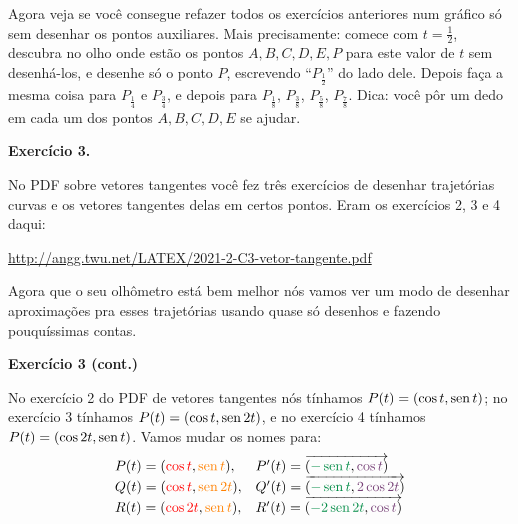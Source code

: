 \documentclass[oneside,12pt]{article}
\begin{document}
Agora veja se você consegue refazer todos os exercícios anteriores num
gráfico só sem desenhar os pontos auxiliares. Mais precisamente:
comece com $t=\frac12$, descubra no olho onde estão os pontos
$A,B,C,D,E,P$ para este valor de $t$ sem desenhá-los, e desenhe só o
ponto $P$, escrevendo ``$P_{\frac12}$'' do lado dele. Depois faça a
mesma coisa para $P_{\frac14}$ e $P_{\frac34}$, e depois para
$P_{\frac18}$, $P_{\frac38}$, $P_{\frac58}$, $P_{\frac78}$. Dica: você
pôr um dedo em cada um dos pontos $A, B, C, D, E$ se ajudar.



\newpage

%                                                 

{\bf Exercício 3.}

No PDF sobre vetores tangentes você fez três exercícios de desenhar
trajetórias curvas e os vetores tangentes delas em certos pontos. Eram
os exercícios 2, 3 e 4 daqui:

\ssk

{\footnotesize

\url{http://angg.twu.net/LATEX/2021-2-C3-vetor-tangente.pdf}

}

\msk

Agora que o seu olhômetro está bem melhor nós vamos ver um modo de
desenhar aproximações pra esses trajetórias usando quase só desenhos e
fazendo pouquíssimas contas.


\newpage


{\bf Exercício 3 (cont.)}

\ssk

\def\CA{\ColorRed}
\def\CB{\ColorOrange}
\def\CC{\ColorGreen}
\def\CD{\ColorViolet}

No exercício 2 do PDF de vetores tangentes nós tínhamos
$P(t) = (\cos t, \operatorname{sen} t)$; no exercício 3 tínhamos
$P(t) = (\cos t, \operatorname{sen} 2 t)$, e no exercício 4 tínhamos
$P(t) = (\cos 2t, \operatorname{sen} t)$. Vamos mudar os nomes para:
%
$$\begin{array}{ll}
  P(t) = (\CA{\cos t}, \CB{\sen t}),  & P'(t) = \VEC{\CC{-\sen t}, \CD{\cos t}} \\
  Q(t) = (\CA{\cos t}, \CB{\sen 2t}), & Q'(t) = \VEC{\CC{-\sen t}, \CD{2\cos 2t}} \\
  R(t) = (\CA{\cos 2t}, \CB{\sen t}), & R'(t) = \VEC{\CC{-2\sen 2t}, \CD{\cos t}} \\
  \end{array}
$$
\end{document}
